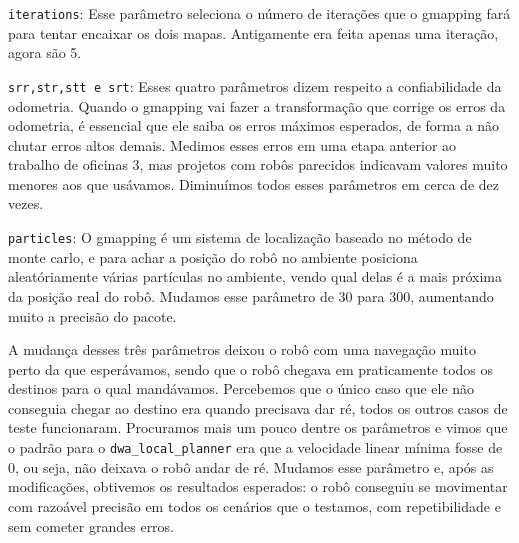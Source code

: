 \begin{compactitem}
\item \verb|iterations|: Esse parâmetro seleciona o número de iterações que o gmapping fará para tentar encaixar os dois mapas. Antigamente era feita apenas uma iteração, agora são 5.
\item \verb|srr,str,stt e srt|: Esses quatro parâmetros dizem respeito a confiabilidade da odometria. Quando o gmapping vai fazer a transformação que corrige os erros da odometria, é essencial que ele saiba os erros máximos esperados, de forma a não chutar erros altos demais. Medimos esses erros em uma etapa anterior ao trabalho de oficinas 3, mas projetos com robôs parecidos indicavam valores muito menores aos que usávamos. Diminuímos todos esses parâmetros em cerca de dez vezes.
\item \verb|particles|: O gmapping é um sistema de localização baseado no método de monte carlo, e para achar a posição do robô no ambiente posiciona aleatóriamente várias partículas no ambiente, vendo qual delas é a mais próxima da posição real do robô. Mudamos esse parâmetro de 30 para 300, aumentando muito a precisão do pacote.
\end{compactitem}

A mudança desses três parâmetros deixou o robô com uma navegação muito perto da que esperávamos, sendo que o robô chegava em praticamente todos os destinos para o qual mandávamos. Percebemos que o único caso que ele não conseguia chegar ao destino era quando precisava dar ré, todos os outros casos de teste funcionaram. Procuramos mais um pouco dentre os parâmetros e vimos que o padrão para o \verb|dwa_local_planner| era que a velocidade linear mínima fosse de 0, ou seja, não deixava o robô andar de ré. Mudamos esse parâmetro e, após as modificações, obtivemos os resultados esperados: o robô conseguiu se movimentar com razoável precisão em todos os cenários que o testamos, com repetibilidade e sem cometer grandes erros.
